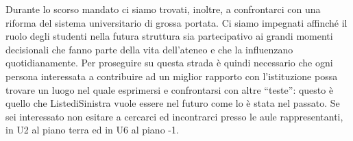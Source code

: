 Durante lo scorso mandato ci siamo trovati, inoltre, a confrontarci con una riforma del sistema universitario di grossa portata. Ci siamo impegnati affinché il ruolo degli studenti nella futura struttura sia partecipativo ai grandi momenti decisionali che fanno parte della vita dell'ateneo e che la influenzano quotidianamente.
Per proseguire su questa strada è quindi necessario che ogni persona interessata a contribuire ad un miglior rapporto con l'istituzione possa trovare un luogo nel quale esprimersi e confrontarsi con altre “teste”: questo è quello che ListediSinistra vuole essere nel futuro come lo è stata nel passato. Se sei interessato non esitare a cercarci ed incontrarci presso le aule rappresentanti, in U2 al piano terra ed in U6 al piano -1.

